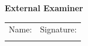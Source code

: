 \begin{center}
    \vspace{1cm}

    \begin{framed}
        \textbf{External Examiner} \\
        \vspace{0.7cm}
        \begin{tabular}{@{}p{}p{}@{}}
            Name: \underline{\hspace{6cm}} & Signature: \underline{\hspace{5cm}} \\
            \vspace{0.2cm}
        \end{tabular}
    \end{framed}
\end{center}